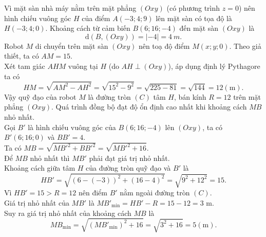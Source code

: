 \begin{ex}
{\begin{center}
		\end{center}
		\begin{itemchoice}
			\itemch Vì mặt sàn nhà máy nằm trên mặt phẳng $(Oxy)$ (có phương trình $z=0$) nên hình chiếu vuông góc $H$ của điểm $A(-3;4;9)$ lên mặt sàn có tọa độ là $H(-3;4;0)$.
			\itemch Khoảng cách từ cảm biến $B(6;16;-4)$ đến mặt sàn $(Oxy)$ là
			$$\mathrm{d}\left(B, (Oxy)\right) = |-4| = 4\ m.$$
			\itemch Robot $M$ di chuyển trên mặt sàn $(Oxy)$ nên toạ độ điểm $M(x;y;0)$. Theo giả thiết, ta có $AM = 15$.\\
			Xét tam giác $AHM$ vuông tại $H$ (do $AH \perp (Oxy)$), áp dụng định lý Pythagore ta có
			$$HM = \sqrt{AM^2 - AH^2} = \sqrt{15^2 - 9^2} = \sqrt{225 - 81} = \sqrt{144} = 12 (\mathrm{m}).$$
			Vậy quỹ đạo của robot $M$ là đường tròn $(C)$ tâm $H$, bán kính $R=12$ trên mặt phẳng $(Oxy)$.
			\itemch Quá trình đồng bộ đạt độ ổn định cao nhất khi khoảng cách $MB$ nhỏ nhất.\\
			Gọi $B'$ là hình chiếu vuông góc của $B(6;16;-4)$ lên $(Oxy)$, ta có $B'(6;16;0)$ và $BB' = 4$.\\
			Ta có $MB = \sqrt{MB'^2 + BB'^2} = \sqrt{MB'^2 + 16}$. \\
			Để $MB$ nhỏ nhất thì $MB'$ phải đạt giá trị nhỏ nhất.\\
			Khoảng cách giữa tâm $H$ của đường tròn quỹ đạo và $B'$ là
			$$HB' = \sqrt{(6 - (-3))^2 + (16 - 4)^2} = \sqrt{9^2 + 12^2} = 15.$$
			Vì $HB' = 15 > R = 12$ nên điểm $B'$ nằm ngoài đường tròn $(C)$.\\
			Giá trị nhỏ nhất của $MB'$ là $MB'_{\min} = HB' - R = 15 - 12 = 3$ m.\\
			Suy ra giá trị nhỏ nhất của khoảng cách $MB$ là
			$$MB_{\min} = \sqrt{(MB'_{\min})^2 + 16} = \sqrt{3^2 + 16} = 5(\mathrm{m}).$$ 
		\end{itemchoice}
	}
\end{ex}

